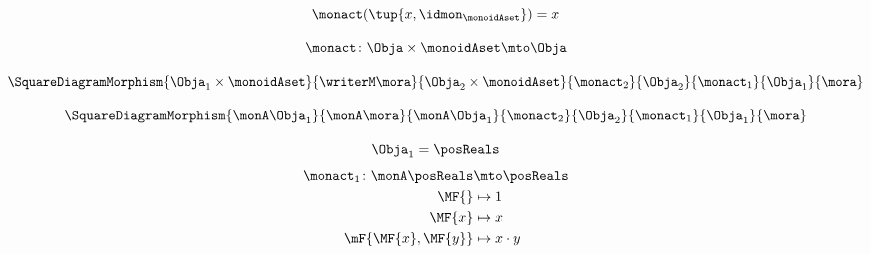 {\begin{forslides}
        \begin{equation}\label{eq:writer-is-monoid-action-unit}
            \monact(\tup{x, \idmon_{\monoidAset}}) = x
        \end{equation}

        \begin{equation}\label{eq:writer-algebras}
            \monact \colon \Obja \times \monoidAset \mto \Obja
        \end{equation}

        \begin{equation}\label{eq:writer-algebra-morphism-square-domain}
            \SquareDiagramMorphism{
                \Obja_1 \times \monoidAset
            }{
                \writerM \mora
            }{
                \Obja_2 \times \monoidAset
            }{
                \monact_2
            }{
                \Obja_2
            }{
                \monact_1
            }{
                \Obja_1
            }{
                \mora
            }
        \end{equation}

        \begin{equation}\label{eq:formal-algebra-morphism-square-domain}
            \SquareDiagramMorphism{
                \monA \Obja_1
            }{
                \monA \mora
            }{
                \monA \Obja_1
            }{
                \monact_2
            }{
                \Obja_2
            }{
                \monact_1
            }{
                \Obja_1
            }{
                \mora
            }
        \end{equation}

        \begin{equation}\label{eq:formal-algebra-morphism-square-1-x}
            \Obja_1 = \posReals
        \end{equation}
        \begin{equation}\label{eq:formal-algebra-morphism-square-1-a}
            \begin{aligned}
                \monact_1 \colon \monA \posReals & \mto \posReals \\
                \MF{}                            & \mapsto 1 \\
                \MF{x}                           & \mapsto x \\
                \mF{\MF{x}, \MF{y}}              & \mapsto x \cdot y
            \end{aligned}
        \end{equation}


\end{forslides}}
